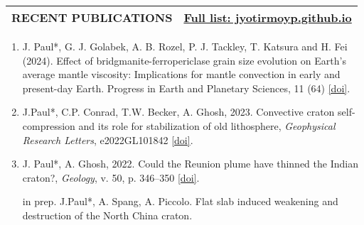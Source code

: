 \documentclass[11pt,a4paper]{article}
\begin{document}
\vspace{-0.3 in}
\begin{longtable}{p{7cm} p{8 cm}}
\hline
\textbf{RECENT PUBLICATIONS} & \href{https://jyotirmoyp.github.io/}{Full list:  jyotirmoyp.github.io} \\
\hline
\end{longtable}
\vspace{-0.3 in}
\begin{enumerate}[noitemsep]
\item J. Paul*, G. J. Golabek, A. B. Rozel, P. J. Tackley, T. Katsura and H. Fei (2024). Effect of bridgmanite-ferropericlase grain size evolution on Earth's average mantle viscosity: Implications for mantle convection in early and present-day Earth. Progress in Earth and Planetary Sciences, 11 (64) \href{https://doi.org/10.1186/s40645-024-00658-3}{[doi]}.
\item J.Paul*, C.P. Conrad, T.W. Becker, A. Ghosh, 2023. Convective craton self-compression and its role for  stabilization of old lithosphere, \textit{Geophysical Research Letters}, e2022GL101842 \href{doi:10.1029/2022GL101842}{[doi]}.

\item J. Paul*, A. Ghosh, 2022. Could the Reunion plume have thinned the Indian craton?, \textit{Geology},  v. 50, p. 346–350 \href{https://doi.org/10.1130/G49492.1}{[doi]}.


\item[in prep. ] J.Paul*, A. Spang, A. Piccolo. Flat slab induced weakening and destruction of the North China craton.


\end{enumerate}
\end{document}
